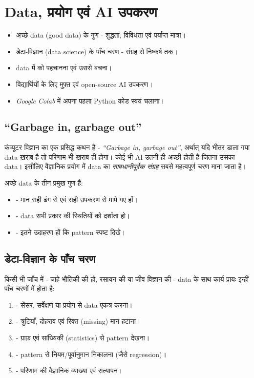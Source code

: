 \chapter{Data, प्रयोग एवं AI उपकरण}
\label{ch:data}

\lakshyaheading
\begin{itemize}[leftmargin=1.4em]
  \item अच्छे data (good data) के गुण - शुद्धता, विविधता एवं पर्याप्त मात्रा।
  \item डेटा-विज्ञान (data science) के पाँच चरण - संग्रह से निष्कर्ष तक।
  \item data में  को पहचानना एवं उससे बचना।
  \item विद्यार्थियों के लिए मुफ़्त एवं open-source AI उपकरण।
  \item \emph{Google Colab} में अपना पहला Python कोड स्वयं चलाना।
\end{itemize}

\section{“Garbage in, garbage out”}

कंप्यूटर विज्ञान का एक प्रसिद्ध कथन है - \emph{“Garbage in, garbage out”}, अर्थात्
यदि भीतर डाला गया data ख़राब है तो परिणाम भी ख़राब ही होगा। कोई भी AI उतनी ही अच्छी
होती है जितना उसका data। इसीलिए वैज्ञानिक प्रयोग में data का \emph{सावधानीपूर्वक संग्रह}
सबसे महत्वपूर्ण चरण माना जाता है।

अच्छे data के तीन प्रमुख गुण हैं:
\begin{itemize}[leftmargin=1.4em]
  \item {} - मान सही ढंग से एवं सही उपकरण से मापे गए हों।
  \item {} - data सभी प्रकार की स्थितियों को दर्शाता हो।
  \item {} - इतने उदाहरण हों कि pattern
        स्पष्ट दिखे।
\end{itemize}

\section{डेटा-विज्ञान के पाँच चरण}

किसी भी जाँच में - चाहे भौतिकी की हो, रसायन की या जीव विज्ञान की - data के साथ कार्य
प्रायः इन्हीं पाँच चरणों में होता है:

\begin{enumerate}[leftmargin=1.8em]
  \item {} - सेंसर, सर्वेक्षण या प्रयोग से data एकत्र करना।
  \item {} - त्रुटियाँ, दोहराव एवं रिक्त (missing) मान हटाना।
  \item {} - ग्राफ़ एवं सांख्यिकी (statistics) से pattern देखना।
  \item {} - pattern से नियम/पूर्वानुमान निकालना (जैसे regression)।
  \item {} - परिणाम की वैज्ञानिक व्याख्या एवं सत्यापन।
\end{enumerate}

